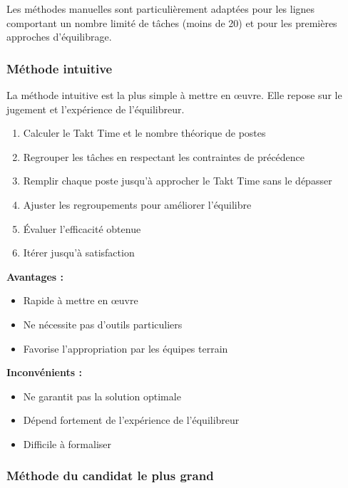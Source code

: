 \documentclass[12pt,a4paper]{article}
\newenvironment{methodbox}[1]
  {\begin{tcolorbox}[colback=blue!5!white, colframe=methodcolor, title=#1]\small}
  {\end{tcolorbox}}
\begin{document}
Les méthodes manuelles sont particulièrement adaptées pour les lignes comportant un nombre limité de tâches (moins de 20) et pour les premières approches d'équilibrage.

\subsubsection{Méthode intuitive}

La méthode intuitive est la plus simple à mettre en œuvre. Elle repose sur le jugement et l'expérience de l'équilibreur.

\begin{methodbox}{Démarche de la méthode intuitive}
\begin{enumerate}
    \item Calculer le Takt Time et le nombre théorique de postes
    \item Regrouper les tâches en respectant les contraintes de précédence
    \item Remplir chaque poste jusqu'à approcher le Takt Time sans le dépasser
    \item Ajuster les regroupements pour améliorer l'équilibre
    \item Évaluer l'efficacité obtenue
    \item Itérer jusqu'à satisfaction
\end{enumerate}
\end{methodbox}

\textbf{Avantages :}
\begin{itemize}
    \item Rapide à mettre en œuvre
    \item Ne nécessite pas d'outils particuliers
    \item Favorise l'appropriation par les équipes terrain
\end{itemize}

\textbf{Inconvénients :}
\begin{itemize}
    \item Ne garantit pas la solution optimale
    \item Dépend fortement de l'expérience de l'équilibreur
    \item Difficile à formaliser
\end{itemize}

\subsubsection{Méthode du candidat le plus grand}
\end{document}
